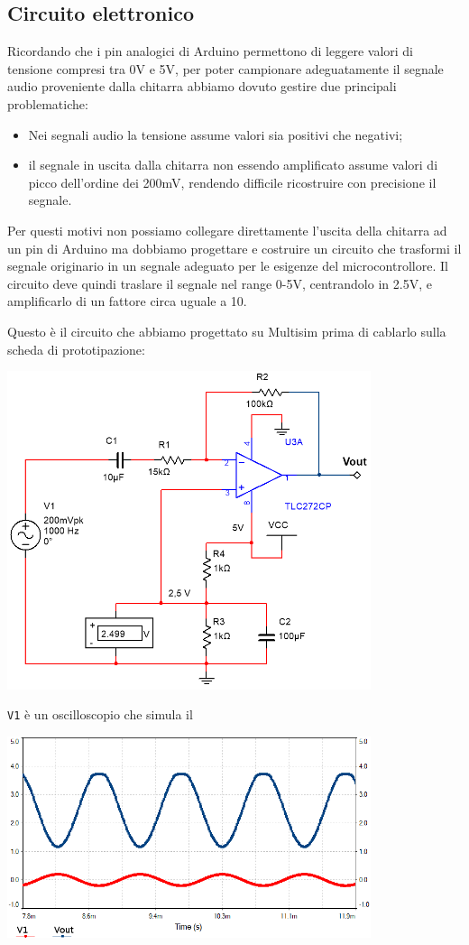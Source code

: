 \documentclass[a4paper,11pt]{article}
\begin{document}
\subsection{Circuito elettronico}
Ricordando che i pin analogici di Arduino permettono di leggere valori di tensione compresi tra 0V e 5V, per poter campionare adeguatamente il segnale audio proveniente dalla chitarra abbiamo dovuto gestire due principali problematiche:
\begin{itemize}
    \item Nei segnali audio la tensione assume valori sia positivi che negativi;
    \item il segnale in uscita dalla chitarra non essendo amplificato assume valori di picco dell'ordine dei 200mV, rendendo difficile ricostruire con precisione il segnale.
\end{itemize}

Per questi motivi non possiamo collegare direttamente l'uscita della chitarra ad un pin di Arduino ma dobbiamo progettare e costruire un circuito che trasformi il segnale originario in un segnale adeguato per le esigenze del microcontrollore.
Il circuito deve quindi traslare il segnale nel range 0-5V, centrandolo in 2.5V, e amplificarlo di un fattore circa uguale a 10.

Questo è il circuito che abbiamo progettato su Multisim prima di cablarlo sulla scheda di prototipazione:

\includegraphics[width=0.8\textwidth]{screen.png}

\texttt{V1} è un oscilloscopio che simula il

\includegraphics[width=0.8\textwidth]{screen2.png}
\end{document}
